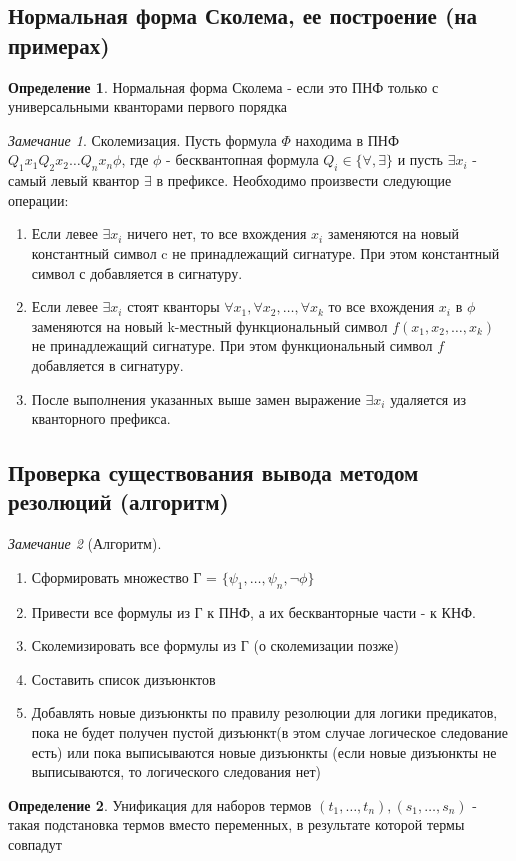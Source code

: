 \documentclass[a4paper]{article}
\theoremstyle{definition}
\newtheorem*{definition}{Определение}
\theoremstyle{remark}
\newtheorem*{remark}{Замечание}
\begin{document}
    \subsection{Нормальная форма Сколема, ее построение (на примерах)}
		\begin{definition}
			Нормальная форма Сколема - если это ПНФ только с универсальными кванторами первого порядка
		\end{definition}
		\begin{remark}
			Сколемизация. Пусть формула $\Phi$ находима в ПНФ $Q_1x_1 Q_2x_2 \dots Q_nx_n\phi$, где $\phi$ - бесквантопная формула $Q_i \in \{\forall, \exists\}$ и пусть $\exists x_i$ - самый левый квантор $\exists$ в префиксе. Необходимо произвести следующие операции:
			\begin{enumerate}
				\item Если левее $\exists x_i$ ничего нет, то все вхождения $x_i$ заменяются на новый константный символ c не принадлежащий сигнатуре. При этом константный символ с добавляется в сигнатуру.
				\item Если левее $\exists x_i$ стоят кванторы $\forall x_1, \forall x_2, \dots, \forall x_k$ то все вхождения $x_i$ в $\phi$ заменяются на новый k-местный функциональный символ $f(x_1, x_2, \dots, x_k)$ не принадлежащий сигнатуре. При этом функциональный символ $f$ добавляется в сигнатуру.
				\item После выполнения указанных выше замен выражение $\exists x_i$  удаляется из кванторного префикса.
			\end{enumerate}
		\end{remark}
    \subsection{Проверка существования вывода методом резолюций (алгоритм)}
	\begin{remark}[Алгоритм]
		\begin{enumerate}
			\item Сформировать множество Г = $\{\psi_1, \dots, \psi_n, \neg \phi\}$
			\item Привести все формулы из Г к ПНФ, а их бескванторные части - к КНФ.
			\item Сколемизировать все формулы из Г (о сколемизации позже)
			\item Составить список дизъюнктов
			\item Добавлять новые дизъюнкты по правилу резолюции для логики предикатов, пока не будет получен пустой дизъюнкт(в этом случае логическое следование есть) или пока выписываются новые дизъюнкты (если новые дизъюнкты не выписываются, то логического следования нет)
		\end{enumerate}
	\end{remark}
    \begin{definition}
        Унификация для наборов термов $(t_1, \dots, t_n), (s_1, \dots, s_n)$ - такая подстановка термов вместо переменных, в результате которой термы совпадут
    \end{definition}
\end{document}
